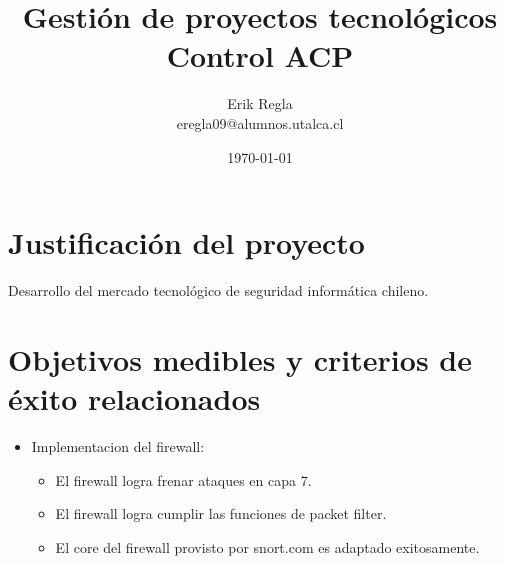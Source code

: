 \documentclass[11pt]{utalcaDoc}
\title{{\bf Gestión de proyectos tecnológicos}\\ Control ACP}
\author{Erik Regla\\ eregla09@alumnos.utalca.cl}
\date{\today}
\begin{document}
\maketitle

\section{Justificación del proyecto}

Desarrollo del mercado tecnológico de seguridad informática chileno.



\section{Objetivos medibles y criterios de éxito relacionados}


\begin{itemize}
  \item{
    Implementacion del firewall:  
    \begin{itemize}
      \item { El firewall logra frenar ataques en capa 7. }
      \item { El firewall logra cumplir las funciones de packet filter.}
      \item { El core del firewall provisto por snort.com es adaptado exitosamente. }
    \end{itemize}
  }
\end{itemize}
\end{document}
